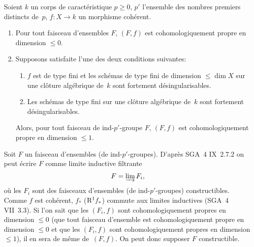 \begin{corollaire}
\label{XIII.3.2}
Soient $k$ un corps de caract\'eristique $p\geq 0$, $p'$ l'ensemble
des nombres premiers distincts de~$p$, $f\colon X\to k$ un morphisme
coh\'erent.
\begin{enumerate}
\item[1)] Pour tout faisceau d'ensembles $F$, $(F,f)$ est
cohomologiquement propre en dimension $\leq 0$.
\item[2)] Supposons satisfaite l'une des deux conditions suivantes:
\begin{enumerate}
\item[a)] $f$ est de type fini et les sch\'emas de type fini de
dimension $\leq\dim X$ sur une cl\^oture alg\'ebrique de~$k$ sont
fortement d\'e\-sin\-gu\-la\-ri\-sables.
\item[b)] Les sch\'emas de type fini sur une cl\^oture
alg\'ebrique de~$k$ sont
fortement d\'esingularisables.
\end{enumerate}
Alors, pour tout faisceau de ind-$p'$-groupe $F$, $(F,f)$ est
cohomologiquement propre en dimension $\leq 1$.
\end{enumerate}
\end{corollaire}

Soit $F$ un faisceau d'ensembles (\resp de
ind-$p'$-groupes). D'apr\`es SGA~4 IX~2.7.2 on peut \'ecrire
$F$ comme limite inductive filtrante
$$
F=\varinjlim F_i,
$$
o\`u les $F_i$ sont des faisceaux d'ensembles (\resp de
ind-$p'$-groupes) constructibles. Comme $f$ est coh\'erent, $f_*$
(\resp $\mathrm{R}^1f_*$) commute aux limites inductives (SGA~4 VII~3.3). Si
l'on sait que les $(F_i,f)$ sont cohomologiquement propres en
dimension $\leq 0$ (\resp que tout faisceau d'ensemble est
cohomologiquement propre en dimension $\leq 0$ et que les $(F_i,f)$
sont cohomologiquement propres en dimension $\leq 1$), il en sera de
m\^eme de~$(F,f)$. On peut donc supposer $F$ constructible.

